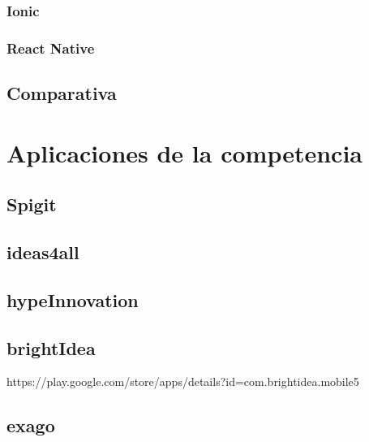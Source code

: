 \subsubsection{Ionic}
\subsubsection{React Native}

\subsection{Comparativa}


\section{Aplicaciones de la competencia}
\subsection{Spigit}
\subsection{ideas4all}
\subsection{hypeInnovation}
\subsection{brightIdea}
https://play.google.com/store/apps/details?id=com.brightidea.mobile5
\subsection{exago}

